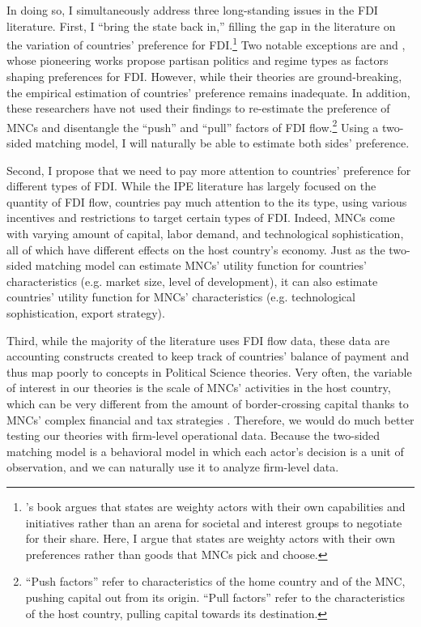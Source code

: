 In doing so, I simultaneously address three long-standing issues in the FDI
literature. First, I ``bring the state back in,'' filling the gap in the literature on the
variation of countries' preference for FDI.\footnote{\citet{Evans1985}'s
book argues that states are weighty actors with their own capabilities and
initiatives rather than an arena for societal and interest groups to negotiate
for their share. Here, I argue that states are weighty actors with their own
preferences rather than goods that MNCs pick and choose.} Two notable exceptions are
\citet{Pinto2013} and \citet{Pandya2016}, whose pioneering works propose
partisan politics and regime types as factors shaping preferences for FDI.
However, while their theories are ground-breaking, the empirical estimation of
countries' preference remains inadequate. In addition, these researchers have
not used their findings to re-estimate the preference of MNCs and disentangle
the ``push'' and ``pull'' factors of FDI flow.\footnote{``Push factors'' refer
  to characteristics of the home country and of the MNC, pushing capital out
  from its origin. ``Pull factors'' refer to the characteristics of the host
  country, pulling capital towards its destination.} Using a two-sided matching
model, I will naturally be able to estimate both sides' preference.

Second, I propose that we need to pay more attention to countries' preference
for different types of FDI. While the IPE literature has largely focused on the
quantity of FDI flow, countries pay much attention to the its type, using
various incentives and restrictions to target certain types of FDI. Indeed, MNCs
come with varying amount of capital, labor demand, and technological
sophistication, all of which have different effects on the host country's
economy. Just as the two-sided matching model can estimate MNCs' utility
function for countries' characteristics (e.g. market size, level of
development), it can also estimate countries' utility function for MNCs'
characteristics (e.g. technological sophistication, export strategy).

Third, while the majority of the literature uses FDI flow data, these data
are accounting constructs created to keep track of countries' balance of payment
and thus map poorly to concepts in Political Science theories. Very often, the
variable of interest in our theories is the scale of MNCs' activities in the
host country, which can be very different from the amount of border-crossing
capital thanks to MNCs' complex financial and tax strategies \citep{Kerner2014}.
Therefore, we would do much better testing our theories with firm-level
operational data. Because the two-sided matching model is a behavioral model in
which each actor's decision is a unit of observation, and we can naturally use
it to analyze firm-level data.

